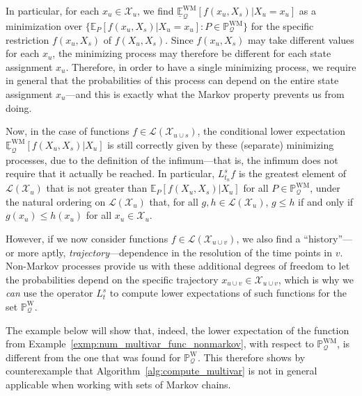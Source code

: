 \documentclass[10pt,a4paper]{paper}
\theoremstyle{definition}
\newcommand{\states}{\mathcal{X}}
\newcommand{\processes}{\mathbb{P}}
\newcommand{\wprocesses}{\processes^{\mathrm{W}}}
\newcommand{\wmprocesses}{\processes^{\mathrm{WM}}}
\newcommand{\gambles}{\mathcal{L}}
\newcommand{\rateset}{\mathcal{Q}}
\begin{document}
In particular, for each $x_u\in\states_u$, we find $\underline{\mathbb{E}}_\rateset^\mathrm{WM}[f(x_u,X_s)\vert X_u=x_u]$ as a minimization over $\{\mathbb{E}_P[f(x_u,X_s)\vert X_u=x_u] : P\in\wmprocesses_\rateset\}$ for the specific restriction $f(x_u,X_s)$ of $f(X_u,X_s)$. Since $f(x_u,X_s)$ may take different values for each $x_u$, the minimizing process may therefore be different for each state assignment $x_u$. Therefore, in order to have a single minimizing process, we require in general that the probabilities of this process can depend on the entire state assignment $x_u$---and this is exactly what the Markov property prevents us from doing.

Now, in the case of functions $f\in\gambles(\states_{u\cup s})$, the conditional lower expectation $\underline{\mathbb{E}}_\rateset^\mathrm{WM}[f(X_u,X_s)\vert X_u]$ is still correctly given by these (separate) minimizing processes, due to the definition of the infimum---that is, the infimum does not require that it actually be reached. In particular, $L_{t_n}^sf$ is the greatest element of $\gambles(\states_u)$ that is not greater than $\mathbb{E}_P[f(X_u,X_s)\vert X_u]$ for all $P\in\wmprocesses_\rateset$, under the natural ordering on $\gambles(\states_u)$ that, for all $g,h\in\gambles(\states_u)$, $g\leq h$ if and only if $g(x_u)\leq h(x_u)$ for all $x_u\in\states_u$.

However, if we now consider functions $f\in\gambles(\states_{u\cup v})$, we also find a ``history''---or more aptly, \emph{trajectory}---dependence in the resolution of the time points in $v$. Non-Markov processes provide us with these additional degrees of freedom to let the probabilities depend on the specific trajectory $x_{u\cup v}\in\states_{u\cup v}$, which is why we \emph{can} use the operator $L_t^s$ to compute lower expectations of such functions for the set $\wprocesses_{\rateset}$.

The example below will show that, indeed, the lower expectation of the function from Example~\ref{exmp:num_multivar_func_nonmarkov}, with respect to $\wmprocesses_\rateset$, is different from the one that was found for $\wprocesses_\rateset$. This therefore shows by counterexample that Algorithm~\ref{alg:compute_multivar} is not in general applicable when working with sets of Markov chains. %
\end{document}

